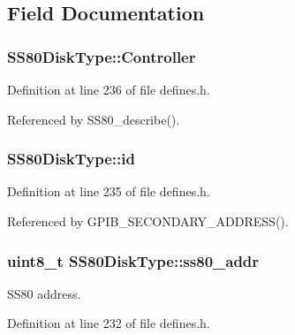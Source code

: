 \subsection{Field Documentation}
\subsubsection[{\texorpdfstring{Controller}{Controller}}]{ S\+S80\+Disk\+Type\+::\+Controller}\hypertarget{structSS80DiskType_a2fe71dc8a453df2e8cde8e8dded1bb63}{}\label{structSS80DiskType_a2fe71dc8a453df2e8cde8e8dded1bb63}


Definition at line 236 of file defines.\+h.



Referenced by S\+S80\+\_\+describe().

\subsubsection[{\texorpdfstring{id}{id}}]{ S\+S80\+Disk\+Type\+::id}\hypertarget{structSS80DiskType_a051107cea479ec682a317e0c44ca5f51}{}\label{structSS80DiskType_a051107cea479ec682a317e0c44ca5f51}


Definition at line 235 of file defines.\+h.



Referenced by G\+P\+I\+B\+\_\+\+S\+E\+C\+O\+N\+D\+A\+R\+Y\+\_\+\+A\+D\+D\+R\+E\+S\+S().

\subsubsection[{\texorpdfstring{ss80\+\_\+addr}{ss80_addr}}]{\setlength{\rightskip}{0pt plus 5cm}uint8\+\_\+t S\+S80\+Disk\+Type\+::ss80\+\_\+addr}\hypertarget{structSS80DiskType_af41bd36ae711bae5aaa86722798ea281}{}\label{structSS80DiskType_af41bd36ae711bae5aaa86722798ea281}


S\+S80 address. 



Definition at line 232 of file defines.\+h.



